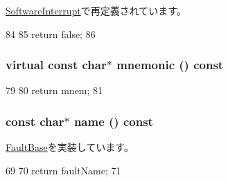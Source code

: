\hyperlink{classX86ISA_1_1SoftwareInterrupt_aa6fbefd34fa168be687772f1e4498220}{SoftwareInterrupt}で再定義されています。


\begin{DoxyCode}
84         {
85             return false;
86         }
\end{DoxyCode}
\hypertarget{classX86ISA_1_1X86FaultBase_ac61515b292d6c2669e040bc32e987aaf}{
\subsubsection[{mnemonic}]{\setlength{\rightskip}{0pt plus 5cm}virtual const char$\ast$ mnemonic () const}}
\label{classX86ISA_1_1X86FaultBase_ac61515b292d6c2669e040bc32e987aaf}



\begin{DoxyCode}
79         {
80             return mnem;
81         }
\end{DoxyCode}
\hypertarget{classX86ISA_1_1X86FaultBase_a862958aa3c2b9bf36903f1f0f2e81c54}{
\subsubsection[{name}]{\setlength{\rightskip}{0pt plus 5cm}const char$\ast$ name () const}}
\label{classX86ISA_1_1X86FaultBase_a862958aa3c2b9bf36903f1f0f2e81c54}


\hyperlink{classFaultBase_aad960357563b8b969d2dffdcc6861de7}{FaultBase}を実装しています。


\begin{DoxyCode}
69         {
70             return faultName;
71         }
\end{DoxyCode}


